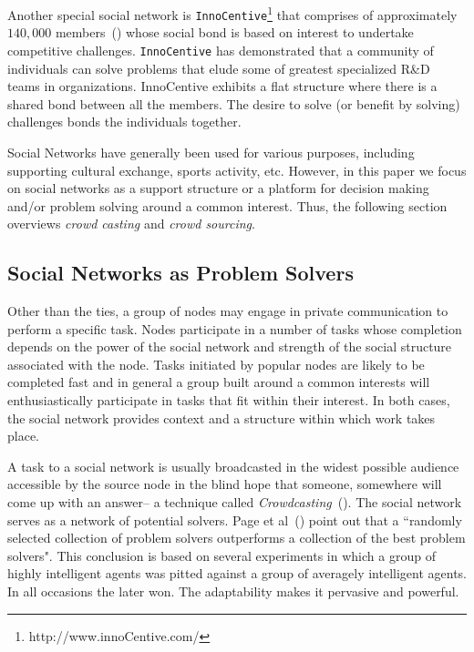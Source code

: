 Another special social network is  \texttt{InnoCentive}\footnote{http://www.innoCentive.com/} that comprises of approximately $140,000$ members~(\cite{howe:08}) whose social bond is based on interest to undertake competitive challenges. \texttt{InnoCentive} has  demonstrated that a community of individuals can solve   problems that elude some of greatest  specialized R\&D teams in organizations.  InnoCentive exhibits a flat structure where there is a shared bond between all the members. The desire to solve (or benefit by solving) challenges bonds the  individuals together.

Social Networks have generally been used for various purposes, including supporting cultural exchange, sports activity,
etc. However, in this paper we focus on social networks as a support structure or a platform for decision making and/or
problem solving around a common interest. Thus, the following section overviews \emph{crowd casting} and \emph{crowd
sourcing}.


\subsection{Social Networks as Problem Solvers} %
\label{sub:social_networks_as_problem_solvers}

Other than the ties, a group of nodes may engage in private communication to perform a specific task. Nodes participate
in a number of tasks whose completion depends on the power of the social network and strength of the social structure
associated with the node. Tasks initiated by popular nodes are likely to be completed fast and in general a group built
around a common interests will enthusiastically participate in tasks that fit within their interest. In both cases, the
social network provides context and a structure within which work takes place.

A task to a social network is usually broadcasted in the widest possible audience accessible by the source node in the
blind hope that someone, somewhere will come up with an answer-- a technique called \emph{Crowdcasting}~(\cite{howe:08}).
The social network serves as a network of potential solvers. Page et al~(\cite{Page:07}) point out that a ``randomly
selected collection of problem solvers outperforms a collection of the best problem solvers". This conclusion is based on
several experiments in which a group of highly intelligent agents was pitted against a group of averagely intelligent
agents. In all occasions the later won. The adaptability makes it pervasive and powerful.


